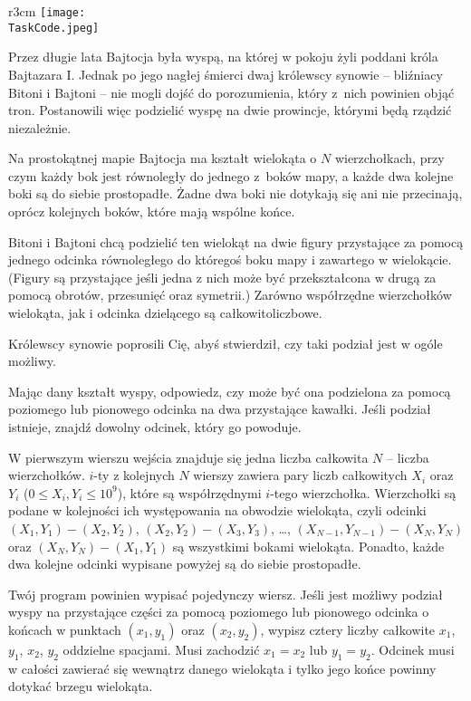 \documentclass{boi2014-pl}
\renewcommand{\TaskCode}{demarcation}
\begin{document}
    \begin{wrapfigure}{r}{3cm}
        \vspace{-24pt}
		\texttt{[image: \\TaskCode.jpeg]}
	\end{wrapfigure}

    Przez długie lata Bajtocja była wyspą, na której w pokoju żyli poddani króla Bajtazara I.
  Jednak po jego nagłej śmierci dwaj królewscy synowie -- bliźniacy Bitoni i Bajtoni -- nie
  mogli dojść do porozumienia, który z~nich powinien objąć tron. Postanowili więc podzielić
  wyspę na dwie prowincje, którymi będą rządzić niezależnie.

  Na prostokątnej mapie Bajtocja ma kształt wielokąta o $N$ wierzchołkach, przy czym każdy bok jest równoległy
  do jednego z~boków mapy, a każde dwa kolejne boki są do siebie prostopadłe.
   Żadne dwa boki nie dotykają się ani nie przecinają, oprócz kolejnych boków, które mają wspólne końce.
  
  
  Bitoni i Bajtoni chcą podzielić ten wielokąt na dwie figury przystające za pomocą
  jednego odcinka równoległego do któregoś boku mapy i zawartego w wielokącie.
  (Figury są przystające jeśli jedna z nich może być przekształcona w drugą za pomocą obrotów, przesunięć oraz symetrii.)
  Zarówno współrzędne wierzchołków wielokąta, jak i odcinka dzielącego są całkowitoliczbowe.

  Królewscy synowie poprosili Cię, abyś stwierdził, czy taki podział jest
  w ogóle możliwy.

    \Task

    Mając dany kształt wyspy, odpowiedz, czy może być ona podzielona za pomocą poziomego lub pionowego
    odcinka na dwa przystające kawałki.
    Jeśli podział istnieje, znajdź dowolny odcinek, który go powoduje.

    \Input
	W pierwszym wierszu wejścia znajduje się jedna liczba całkowita $N$ -- liczba wierzchołków.
        $i$-ty z kolejnych $N$ wierszy zawiera pary liczb całkowitych $X_i$ oraz $Y_i$ ($0 \le X_i, Y_i \le 10^9$), które są współrzędnymi $i$-tego wierzchołka.
        Wierzchołki są podane w kolejności ich występowania na obwodzie wielokąta,
        czyli odcinki $(X_1,Y_1) - (X_2,Y_2)$,
    $(X_2,Y_2) - (X_3,Y_3)$, \ldots, $(X_{N-1},Y_{N-1}) - (X_N,Y_N)$ oraz
    $(X_N,Y_N) - (X_1,Y_1)$ są wszystkimi bokami wielokąta.
        Ponadto, każde dwa kolejne odcinki wypisane powyżej są do siebie prostopadłe.

	\Output
        Twój program powinien wypisać pojedynczy wiersz.
        Jeśli jest możliwy podział wyspy na przystające części za pomocą poziomego lub pionowego odcinka o
        końcach w punktach $(x_1,y_1)$ oraz $(x_2,y_2)$, wypisz cztery liczby całkowite $x_1$, $y_1$, $x_2$, $y_2$ oddzielne spacjami.
        Musi zachodzić $x_1 = x_2$ lub $y_1 = y_2$.
        Odcinek musi w całości zawierać się wewnątrz danego wielokąta i tylko jego końce powinny dotykać brzegu wielokąta.
 
\end{document}
